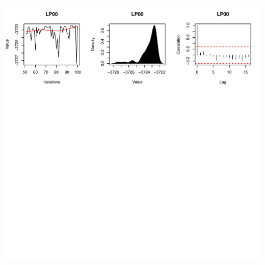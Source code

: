 \documentclass{article}\usepackage[]{graphicx}\usepackage[]{color}
\makeatletter
\def\maxwidth{ %
  \ifdim\Gin@nat@width>\linewidth
    \linewidth
  \else
    \Gin@nat@width
  \fi
}
\newenvironment{knitrout}{}{} %
\makeatother
\begin{document}
\begin{knitrout}
\includegraphics[width=\maxwidth]{figure/unnamed-chunk-133} 

\end{knitrout}
\end{document}
